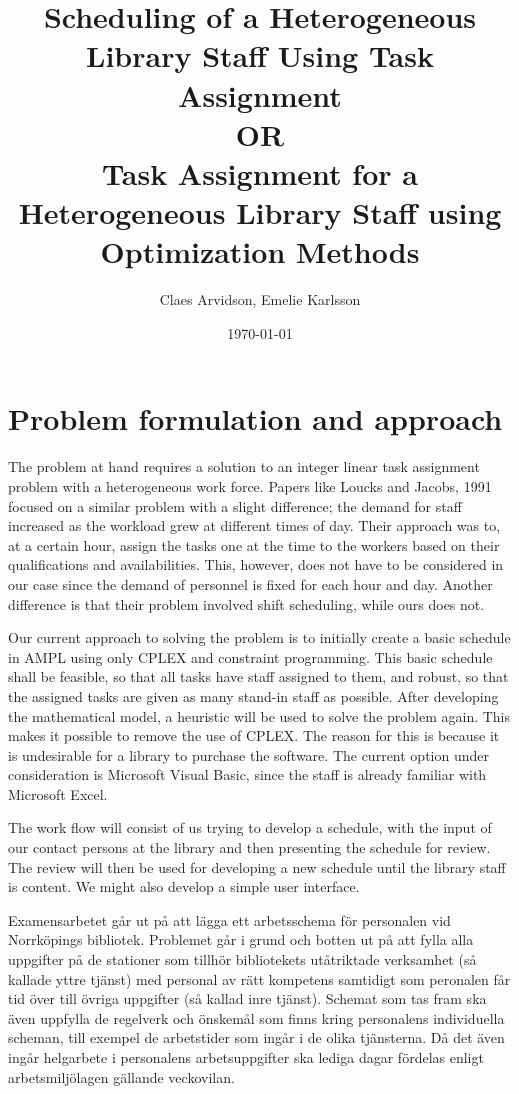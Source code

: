 \documentclass{article}
\title{Scheduling of a Heterogeneous Library Staff Using Task Assignment \\ OR \\
Task Assignment for a Heterogeneous Library Staff using Optimization Methods}
\author{Claes Arvidson, Emelie Karlsson}
\date{\today}
\begin{document}
 
\maketitle
\pagebreak
 
\section*{Problem formulation and approach}
The problem at hand requires a solution to an integer linear task assignment problem with a heterogeneous work force. Papers like Loucks and Jacobs, 1991 focused on a similar problem with a slight difference; the demand for staff increased as the workload grew at different times of day. Their approach was to, at a certain hour, assign the tasks one at the time to the workers based on their qualifications and availabilities. This, however, does not have to be considered in our case since the demand of personnel is fixed for each hour and day. Another difference is that their problem involved shift scheduling, while ours does not.

Our current approach to solving the problem is to initially create a basic schedule in AMPL using only CPLEX and constraint programming. This basic schedule shall be feasible, so that all tasks have staff assigned to them, and robust, so that the assigned tasks are given as many stand-in staff as possible. After developing the mathematical model, a heuristic will be used to solve the problem again. This makes it possible to remove the use of CPLEX. The reason for this is because it is undesirable for a library to purchase the software. The current option under consideration is Microsoft Visual Basic, since the staff is already familiar with Microsoft Excel.

The work flow will consist of us trying to develop a schedule, with the input of our contact persons at the library and then presenting the schedule for review. The review will then be used for developing a new schedule until the library staff is content. We might also develop a simple user interface. 


\iffalse
Examensarbetet går ut på att lägga ett arbetsschema för personalen vid Norrköpings bibliotek. Problemet går i grund och botten ut på att fylla alla uppgifter på de stationer som tillhör bibliotekets utåtriktade verksamhet (så kallade yttre tjänst) med personal av rätt kompetens samtidigt som peronalen får tid över till övriga uppgifter (så kallad inre tjänst). Schemat som tas fram ska även uppfylla de regelverk och önskemål som finns kring personalens individuella scheman, till exempel de arbetstider som ingår i de olika tjänsterna. Då det även ingår helgarbete i personalens arbetsuppgifter ska lediga dagar fördelas enligt arbetsmiljölagen gällande veckovilan.
\end{document}
